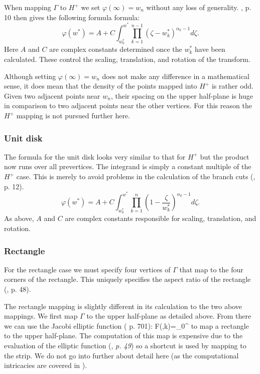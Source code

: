 When mapping $\Gamma$ to $H^+$ we set $\varphi(\infty) = w_n$ without any loss of generality. \cite{driscoll}, p. 10 then gives the following formula formula:
\begin{equation}
\varphi(w^*) = A + C \int^{w^*}_{w^*_0} \prod_{k=1}^{n-1} (\zeta-w^*_k)^{\alpha_k-1} d\zeta.
\end{equation}
Here $A$ and $C$ are complex constants determined once the $w^*_k$ have been calculated. These control the scaling, translation, and rotation of the transform.

Although setting $\varphi(\infty) = w_n$ does not make any difference in a mathematical sense, it does mean that the density of the points mapped into $H^+$ is rather odd. Given two adjacent points near $w_n$, their spacing on the upper half-plane is huge in comparison to two adjacent points near the other vertices. For this reason the $H^+$ mapping is not pursued further here.

\subsubsection{Unit disk}

The formula for the unit disk looks very similar to that for $H^+$ but the product now runs over all prevertices. The integrand is simply a constant multiple of the $H^+$ case. This is merely to avoid problems in the calculation of the branch cuts (\cite{driscoll}, p. 12).
\begin{equation}
\label{unitscmap}
\varphi(w^*) = A + C \int^{w^*}_{w^*_0} \prod_{k=1}^{n} (1 - \frac{\zeta}{w^*_k})^{\alpha_k-1} d\zeta.
\end{equation}
As above, $A$ and $C$ are complex constants responsible for scaling, translation, and rotation.

\subsubsection{Rectangle}
For the rectangle case we must specify four vertices of $\Gamma$ that map to the four corners of the rectangle. This uniquely specifies the aspect ratio of the rectangle (\cite{driscoll}, p. 48).

The rectangle mapping is slightly different in its calculation to the two above mappings. We first map $\Gamma$ to the upper half-plane as detailed above. From there we can use the Jacobi elliptic function (\cite{handbuch} p. 701):
\be
F(\gamma,k)=\int_0^\gamma {}
\ee
to map a rectangle to the upper half-plane. The computation of this map is expensive due to the evaluation of the elliptic function (\cite{driscoll}, \emph{p. 49}) so a shortcut is used by mapping to the strip. We do not go into further about detail here (as the computational intricacies are covered in \cite{howell90}).

